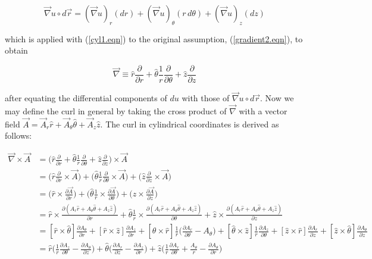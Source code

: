 \documentclass[12pt]{article}
\theoremstyle{definition}
\numberwithin{equation}{section}
\begin{document}
\begin{equation}
\vec{\nabla}u\circ d\vec{r}=(\vec{\nabla}u)_{r}(dr)+(\vec{\nabla}u)_{\theta}(r\,d\theta)+(\vec{\nabla}u)_{z}(dz)
\end{equation}

which is applied with (\ref{cyl1.eqn}) to the original assumption, (\ref{gradient2.eqn}), to obtain

\begin{equation}
\vec{\nabla}\equiv \hat{r}\frac{\partial}{\partial r} + \hat{\theta}\frac{1}{r}\frac{\partial}{\partial\theta}+\hat{z}\frac{\partial}{\partial z}
\end{equation}

after equating the differential components of $du$ with those of $\vec{\nabla}u\circ d\vec{r}$. Now we may define the curl in general by taking the cross product of $\vec{\nabla}$ with a vector field $\vec{A}=\vec{A}_{r}\hat{r}+\vec{A}_{\theta}\hat{\theta}+\vec{A}_{z}\hat{z}$. The curl in cylindrical coordinates is derived as follows:
\begin{adjustwidth*}{-44mm}{-25mm}

\begin{align}
\vec{\nabla}\times\vec{A} &= \bigg(\hat{r}\frac{\partial}{\partial r}+\hat{\theta}\frac{1}{r}\frac{\partial}{\partial\theta}+\hat{z}\frac{\partial}{\partial z}\bigg)\times\vec{A}\nonumber 
\\&= \bigg(\hat{r}\frac{\partial}{\partial r}\times\vec{A}\bigg)+\bigg(\hat{\theta}\frac{1}{r}\frac{\partial}{\partial\theta}\times\vec{A}\bigg)+\bigg(\hat{z}\frac{\partial}{\partial z}\times\vec{A}\bigg)\nonumber 
\\&= 
\bigg(\hat{r}\times\frac{\partial\vec{A}}{\partial r}\bigg)+\bigg(\hat{\theta}\frac{1}{r}\times\frac{\partial\vec{A}}{\partial\theta}\bigg)+\bigg(\hat{z}\times\frac{\partial\vec{A}}{\partial z}\bigg)\nonumber 
\\&= 
\hat{r}\times\frac{\partial (A_r\hat{r}+A_{\theta}\hat{\theta}+A_z\hat{z})}{\partial r}+\hat{\theta}\frac{1}{r}\times\frac{\partial (A_r\hat{r}+A_{\theta}\hat{\theta}+A_z\hat{z})}{\partial\theta}+\hat{z}\times\frac{\partial (A_r\hat{r}+A_{\theta}\hat{\theta}+A_z\hat{z})}{\partial z}\nonumber 
\\&= 
[\hat{r}\times\hat{\theta}]\frac{\partial A_{\theta}}{\partial r}+[\hat{r}\times\hat{z}]\frac{\partial A_z}{\partial r}+[\hat{\theta}\times\hat{r}]\frac{1}{r}\bigg(\frac{\partial A_r}{\partial\theta}-A_{\theta}\bigg)+[\hat{\theta}\times\hat{z}]\frac{1}{r}\frac{\partial A_z}{\partial\theta}+[\hat{z}\times\hat{r}]\frac{\partial A_r}{\partial z}+[\hat{z}\times\hat{\theta}]\frac{\partial A_{\theta}}{\partial z}\label{cylcurl1.eqn} 
\\&= 
\hat{r}\bigg(\frac{1}{r}\frac{\partial A_z}{\partial\theta}-\frac{\partial A_{\theta}}{\partial z}\bigg)+\hat{\theta}\bigg(\frac{\partial A_r}{\partial z}-\frac{\partial A_z}{\partial r}\bigg)+\hat{z}\bigg(\frac{1}{r}\frac{\partial A_r}{\partial\theta}+\frac{A_{\theta}}{r}-\frac{\partial A_{\theta}}{\partial r}\bigg)\label{cylcurl.eqn}
\end{align}
\end{adjustwidth*}
\end{document}
